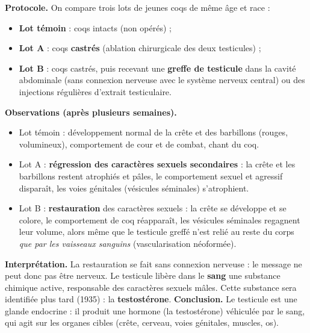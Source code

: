 \documentclass[11pt]{article}
\begin{document}
\begin{experience}
\textbf{Protocole.} On compare trois lots de jeunes coqs de même âge et race :
\begin{itemize}
\item \textbf{Lot témoin} : coqs intacts (non opérés) ;
\item \textbf{Lot A} : coqs \textbf{castrés} (ablation chirurgicale des deux testicules) ;
\item \textbf{Lot B} : coqs castrés, puis recevant une \textbf{greffe de testicule} dans la cavité abdominale (sans connexion nerveuse avec le système nerveux central) ou des injections régulières d'extrait testiculaire.
\end{itemize}
\textbf{Observations (après plusieurs semaines).}
\begin{itemize}
\item Lot témoin : développement normal de la crête et des barbillons (rouges, volumineux), comportement de cour et de combat, chant du coq.
\item Lot A : \textbf{régression des caractères sexuels secondaires} : la crête et les barbillons restent atrophiés et pâles, le comportement sexuel et agressif disparaît, les voies génitales (vésicules séminales) s'atrophient.
\item Lot B : \textbf{restauration} des caractères sexuels : la crête se développe et se colore, le comportement de coq réapparaît, les vésicules séminales regagnent leur volume, alors même que le testicule greffé n'est relié au reste du corps \emph{que par les vaisseaux sanguins} (vascularisation néoformée).
\end{itemize}
\textbf{Interprétation.} La restauration se fait sans connexion nerveuse : le message ne peut donc pas être nerveux. Le testicule libère dans le \textbf{sang} une substance chimique active, responsable des caractères sexuels mâles. Cette substance sera identifiée plus tard (1935) : la \textbf{testostérone}.
\textbf{Conclusion.} Le testicule est une glande endocrine : il produit une hormone (la testostérone) véhiculée par le sang, qui agit sur les organes cibles (crête, cerveau, voies génitales, muscles, os).
\end{experience}
\end{document}
